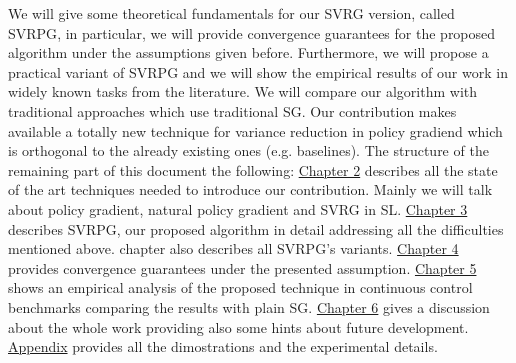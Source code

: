We will give some theoretical fundamentals for our \acs{SVRG} version, called \acs{SVRPG}, in particular, we will provide convergence guarantees for the proposed algorithm under the assumptions given before. Furthermore, we will propose a practical variant of \acs{SVRPG} and we will show the empirical results of our work in widely known tasks from the literature. We will compare our algorithm with traditional approaches which use traditional \acs{SG}.
Our contribution makes available a totally new technique for variance reduction in policy gradiend which is orthogonal to the already existing ones (e.g. baselines).\newline
The structure of the remaining part of this document the following:
\hyperref[chap:art]{Chapter 2} describes all the state of the art techniques needed to introduce our contribution. Mainly we will talk about policy gradient, natural policy gradient and \acs{SVRG} in \acs{SL}.\newline
\hyperref[chap:art]{Chapter 3} describes \acs{SVRPG}, our proposed algorithm in detail addressing all the difficulties mentioned above. chapter also describes all \acs{SVRPG}'s variants.\newline
\hyperref[chap:art]{Chapter 4} provides convergence guarantees under the presented assumption.\newline
\hyperref[chap:art]{Chapter 5} shows an empirical analysis of the proposed technique in continuous control benchmarks comparing the results with plain \acs{SG}.\newline
\hyperref[chap:art]{Chapter 6} gives a discussion about the whole work providing also some hints about future development.\newline
\hyperref[chap:art]{Appendix} provides all the dimostrations and the experimental details.

